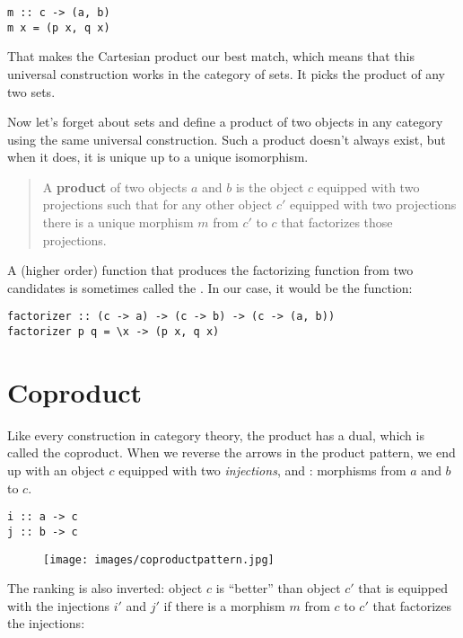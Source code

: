 \begin{Verbatim}
m :: c -> (a, b)
m x = (p x, q x)
\end{Verbatim}
That makes the Cartesian product  our best match, which
means that this universal construction works in the category of sets. It
picks the product of any two sets.

Now let's forget about sets and define a product of two objects in any
category using the same universal construction. Such a product doesn't
always exist, but when it does, it is unique up to a unique isomorphism.

\begin{quote}
A \textbf{product} of two objects $a$ and $b$ is the object
$c$ equipped with two projections such that for any other object
$c'$ equipped with two projections there is a unique morphism
$m$ from $c'$ to $c$ that factorizes those projections.
\end{quote}

\noindent
A (higher order) function that produces the factorizing function
 from two candidates is sometimes called the
. In our case, it would be the function:

\begin{Verbatim}
factorizer :: (c -> a) -> (c -> b) -> (c -> (a, b))
factorizer p q = \x -> (p x, q x)
\end{Verbatim}

\section{Coproduct}

Like every construction in category theory, the product has a dual,
which is called the coproduct. When we reverse the arrows in the product
pattern, we end up with an object $c$ equipped with two
\emph{injections},  and : morphisms from $a$
and $b$ to $c$.

\begin{Verbatim}
i :: a -> c
j :: b -> c
\end{Verbatim}

\begin{figure}[H]
\centering
\texttt{[image: images/coproductpattern.jpg]}
\end{figure}

\noindent
The ranking is also inverted: object $c$ is ``better'' than object
$c'$ that is equipped with the injections $i'$ and $j'$
if there is a morphism $m$ from $c$ to $c'$ that
factorizes the injections:

